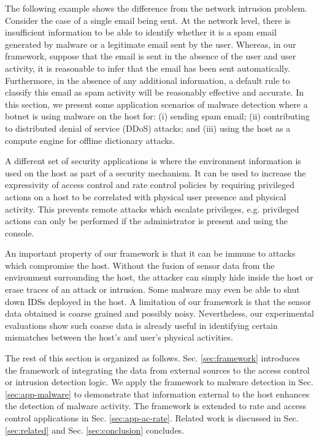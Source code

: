 The following example shows the difference
from the network intrusion problem. Consider the case of a single
email being sent. At the network level, there is insufficient
information to be able to identify whether it is a spam email
generated by malware or a legitimate email sent by the user. 
Whereas, in our framework, suppose that the
email is sent in the absence of the user and user activity, it is
reasonable to infer that the email has been sent automatically.
Furthermore, in the absence of any additional information, 
a default rule to classify this email as spam activity will be reasonably
effective and accurate.
In this section,
we present some application scenarios of malware detection where a botnet
is using malware on the host for:
(i) sending spam email;
(ii) contributing to distributed denial of service (DDoS) attacks; 
and (iii) using the host as a compute engine for offline
dictionary attacks.

A different set of security applications is where the
environment information is used on the host as part of a security mechanism.
It can be used to increase the expressivity of
access control and rate control policies
by requiring privileged actions on a host to be correlated with
physical user presence and physical activity.
This prevents remote attacks which
escalate privileges, e.g.
privileged actions can only
be performed if the administrator is present
and using the console.

An important property of our framework is that it can be immune
to attacks which compromise the host.
Without the fusion of sensor data from the environment surrounding the host, 
the attacker can simply hide inside the host or erase traces of an
attack or intrusion. Some malware may even be able
to shut down IDSs deployed in the host. A limitation of our
framework is that the sensor data obtained is coarse grained and
possibly noisy. Nevertheless, our experimental evaluations show 
such coarse data is already useful in identifying certain 
mismatches between the host's and user's physical activities.

The rest of this section is organized as follows. Sec.
\ref{sec:framework} introduces the framework of integrating the data
from external sources to the access control or intrusion detection
logic.
We apply the framework to malware detection in Sec.
\ref{sec:app-malware} to demonstrate that information
external to the host enhances the detection of malware activity.
The framework is extended to rate and access control applications in
Sec. \ref{sec:app-ac-rate}.
Related work is discussed in Sec. \ref{sec:related}
and Sec. \ref{sec:conclusion} concludes.
